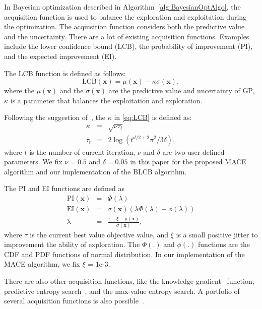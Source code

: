In Bayesian optimization described in Algorithm~\ref{alg:BayesianOptAlgo}, the acquisition function is used to balance the exploration and exploitation during the optimization. The acquisition function considers both the predictive value and the uncertainty. There are a lot of existing acquisition functions. Examples include the lower confidence bound (LCB), the probability of improvement (PI), and the expected improvement (EI).

The LCB function is defined as follows:
\begin{equation}
    \label{eq:LCB}
    \mathrm{LCB}(\bm{x}) = \mu(\bm{x}) - \kappa \sigma(\bm{x}),
\end{equation}
where the $\mu(\bm{x})$ and the $\sigma(\bm{x})$ are the predictive value and uncertainty of GP, $\kappa$ is a parameter that balances the exploitation and exploration.

Following the suggestion of~\cite{brochu2010tutorial}, the $\kappa$ in \eqref{eq:LCB} is defined as:
\begin{equation}
    \label{eq:LCBKappa}
    \begin{array}{lll}
        \kappa &=& \sqrt{\nu \tau_t} \\
        \tau_t &=& 2 \log(t^{d/2+2} \pi^2 / 3 \delta),
    \end{array}
\end{equation}
where $t$ is the number of current iteration, $\nu$ and $\delta$ are two user-defined parameters. We fix $\nu = 0.5$ and $\delta = 0.05$ in this paper for the proposed MACE algorithm and our implementation of the BLCB algorithm.

The PI and EI functions are defined as
\begin{equation}
    \label{eq:PI_EI}
    \begin{array}{lll}
        \mathrm{PI}(\bm{x}) &=& \Phi(\lambda) \\
        \mathrm{EI}(\bm{x}) &=& \sigma(\bm{x}) (\lambda \Phi(\lambda) + \phi(\lambda))     \\
        \mathrm{\lambda}    &=& \displaystyle \frac{\tau - \xi - \mu(\bm{x})}{\sigma(\bm{x})},
    \end{array}
\end{equation}
where $\tau$ is the current best value objective value, and $\xi$ is a small positive jitter to improvement the ability of exploration. The $\Phi(.)$ and $\phi(.)$ functions are the CDF and PDF functions of normal distribution. In our implementation of the MACE algorithm, we fix $\xi$ = 1e-3.


There are also other acquisition functions, like the knowledge gradient~\cite{scott2011correlated} function, predictive entropy search~\cite{hernandez2014predictive}, and the max-value entropy search\cite{wang2017max}. A portfolio of several acquisition functions is also possible~\cite{hoffman2011portfolio}.
